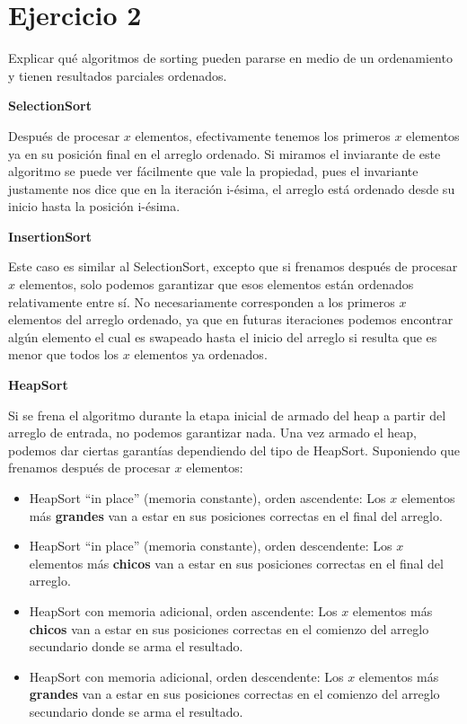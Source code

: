 \section*{Ejercicio 2}

Explicar qué algoritmos de sorting pueden pararse en medio de un ordenamiento y tienen resultados parciales ordenados.

\textbf{SelectionSort}

Después de procesar $x$ elementos, efectivamente tenemos los primeros $x$ elementos ya en su posición final en el arreglo ordenado. Si miramos el inviarante de este algoritmo se puede ver fácilmente que vale la propiedad, pues el invariante justamente nos dice que en la iteración i-ésima, el arreglo está ordenado desde su inicio hasta la posición i-ésima.

\textbf{InsertionSort}

Este caso es similar al SelectionSort, excepto que si frenamos después de procesar $x$ elementos, solo podemos garantizar que esos elementos están ordenados relativamente entre sí. No necesariamente corresponden a los primeros $x$ elementos del arreglo ordenado, ya que en futuras iteraciones podemos encontrar algún elemento el cual es swapeado hasta el inicio del arreglo si resulta que es menor que todos los $x$ elementos ya ordenados.

\textbf{HeapSort}

Si se frena el algoritmo durante la etapa inicial de armado del heap a partir del arreglo de entrada, no podemos garantizar nada. Una vez armado el heap, podemos dar ciertas garantías dependiendo del tipo de HeapSort. Suponiendo que frenamos después de procesar $x$ elementos:

\begin{itemize}
    \item HeapSort ``in place'' (memoria constante), orden ascendente: Los $x$ elementos más \textbf{grandes} van a estar en sus posiciones correctas en el final del arreglo.
    \item HeapSort ``in place'' (memoria constante), orden descendente: Los $x$ elementos más \textbf{chicos} van a estar en sus posiciones correctas en el final del arreglo.
    \item HeapSort con memoria adicional, orden ascendente: Los $x$ elementos más \textbf{chicos} van a estar en sus posiciones correctas en el comienzo del arreglo secundario donde se arma el resultado.
    \item HeapSort con memoria adicional, orden descendente: Los $x$ elementos más \textbf{grandes} van a estar en sus posiciones correctas en el comienzo del arreglo secundario donde se arma el resultado.
\end{itemize}

